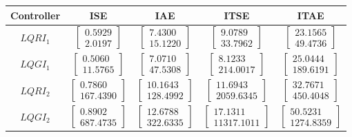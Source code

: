 \documentclass[a4paper,11pt]{book}
\numberwithin{figure}{chapter}
\numberwithin{equation}{chapter}
\numberwithin{table}{chapter}
\theoremstyle{definition}
\begin{document}
\begin{table}[ht]
	\centering
	\begin{tabular}{c | c c c c}
		\textbf{Controller} & \textbf{ISE} & \textbf{IAE} & \textbf{ITSE} & \textbf{ITAE} \\
		\hline
		$LQRI_1$  & $\begin{bmatrix} 0.5929  \\  2.0197 \end{bmatrix}$ & $\begin{bmatrix} 7.4300  \\ 15.1220 \end{bmatrix}$ & $\begin{bmatrix} 9.0789  \\ 33.7962 \end{bmatrix}$ & $\begin{bmatrix} 23.1565  \\ 49.4736 \end{bmatrix}$ \\
		$LQGI_1$ & $\begin{bmatrix}  0.5060 \\  11.5765 \end{bmatrix}$ & $\begin{bmatrix}  7.0710 \\  47.5308 \end{bmatrix}$ & $\begin{bmatrix}  8.1233 \\ 214.0017 \end{bmatrix}$ & $\begin{bmatrix} 25.0444 \\ 189.6191 \end{bmatrix}$ \\
		$LQRI_2$ & $\begin{bmatrix} 0.7860  \\ 167.4390 \end{bmatrix}$ & $\begin{bmatrix} 10.1643  \\ 128.4992 \end{bmatrix}$ & $\begin{bmatrix} 11.6943  \\ 2059.6345 \end{bmatrix}$ & $\begin{bmatrix} 32.7671  \\ 450.4048 \end{bmatrix}$ \\
		$LQGI_2$ & $\begin{bmatrix} 0.8902	\\ 687.4735 \end{bmatrix}$ & $\begin{bmatrix} 12.6788	\\ 322.6335 \end{bmatrix}$ & $\begin{bmatrix} 17.1311	\\ 11317.1011 \end{bmatrix}$ & $\begin{bmatrix} 50.5231	\\ 1274.8359 \end{bmatrix}$ \\
	\end{tabular}
	

\end{table}
\end{document}
